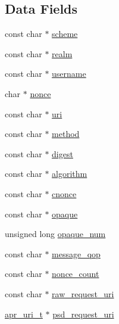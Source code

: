\subsection*{Data Fields}
\begin{DoxyCompactItemize}
\item 
const char $\ast$ \hyperlink{structdigest__header__struct_aa47c6deddbad4a52ea09eb7643050949}{scheme}
\item 
const char $\ast$ \hyperlink{structdigest__header__struct_a936ac68d0274831295bf3c88a88b2b4a}{realm}
\item 
const char $\ast$ \hyperlink{structdigest__header__struct_a65a6fbd18676e8798b4a2d4aae2f7616}{username}
\item 
char $\ast$ \hyperlink{structdigest__header__struct_a2eb4f33eb267d228d7edc9f4363bb60d}{nonce}
\item 
const char $\ast$ \hyperlink{structdigest__header__struct_a52ea9a00e5d13c55c30a8aeaac90f740}{uri}
\item 
const char $\ast$ \hyperlink{structdigest__header__struct_acac8872624a455be36cb2009c42ce1c6}{method}
\item 
const char $\ast$ \hyperlink{structdigest__header__struct_a6348e874cce32fecbf49a016c9a9c21c}{digest}
\item 
const char $\ast$ \hyperlink{structdigest__header__struct_a84b5a0819338fcd1e08f004aab6d9e71}{algorithm}
\item 
const char $\ast$ \hyperlink{structdigest__header__struct_aff899fb8c922488916ee5451db8432cd}{cnonce}
\item 
const char $\ast$ \hyperlink{structdigest__header__struct_a2569399ef868f0064d2a864ee0c5f728}{opaque}
\item 
unsigned long \hyperlink{structdigest__header__struct_a03d169f6990ff04bb646551f8ccad7d0}{opaque\+\_\+num}
\item 
const char $\ast$ \hyperlink{structdigest__header__struct_afa0f265d4ca75d3e04fb37dad057db94}{message\+\_\+qop}
\item 
const char $\ast$ \hyperlink{structdigest__header__struct_a845ffc44e72df70035a40fa1d396d620}{nonce\+\_\+count}
\item 
const char $\ast$ \hyperlink{structdigest__header__struct_a83cd1c4d82e4165f6c77163e532e88b3}{raw\+\_\+request\+\_\+uri}
\item 
\hyperlink{structapr__uri__t}{apr\+\_\+uri\+\_\+t} $\ast$ \hyperlink{structdigest__header__struct_afbc475226977aa2827073b897097654f}{psd\+\_\+request\+\_\+uri}
\item 

\end{DoxyCompactItemize}
